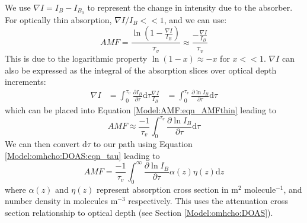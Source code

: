   We use $\nabla I = I_B - I_{B_0}$ to represent the change in intensity due to the absorber. 
  For optically thin absorption, $\nabla I / I_B << 1$, and we can use:
  \begin{equation} \label{Model:AMF:eqn_AMFthin}
    AMF = \frac{\ln{ \left( 1 - \frac{\nabla I}{I_B} \right)} }{\tau_v} \approx \frac{ - \frac{\nabla I}{I_B} }{\tau_v}
  \end{equation}
  This is due to the logarithmic property $\ln \left(1-x \right) \approx -x$ for $x<<1$.
  $\nabla I$ can also be expressed as the integral of the absorption slices over optical depth increments: 
  \begin{eqnarray*}
    \nabla I &= \int_0^{\tau_v}{\frac{\partial I_B}{\partial \tau} \mathrm{d}\tau}
    \frac{\nabla I}{I_B} & = \int_0^{\tau_v}{\frac{\partial \ln{I_B}}{\partial \tau} \mathrm{d}\tau}
  \end{eqnarray*}
  which can be placed into Equation \ref{Model:AMF:eqn_AMFthin} leading to
  \begin{equation*}
    AMF \approx \frac{-1}{\tau_v} \int_0^{\tau_v}{\frac{\partial \ln{I_B}}{\partial \tau} \mathrm{d}\tau}
  \end{equation*}
  We can then convert $\text{d}\tau$ to our path using Equation \ref{Model:omhcho:DOAS:eqn_tau} leading to
  \begin{equation} \label{Model:AMF:eqn_AMFcross}
    AMF = \frac{-1}{\tau_v} \int_0^\infty {\frac{\partial \ln{I_B}}{\partial \tau} \alpha(z)\eta(z)\mathrm{d}z}
  \end{equation}
  where $\alpha(z)$ and $\eta(z)$ represent absorption cross section in m$^2$ molecule$^{-1}$, and number density in molecules m$^{-3}$ respectively. 
  This uses the attenuation cross section relationship to optical depth (see Section \ref{Model:omhcho:DOAS}).
  
